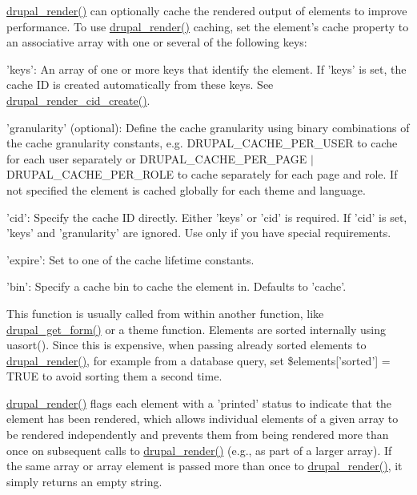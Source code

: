 \hyperlink{common_8inc_a05798b44e8d6c496d4bee5cc32fa7851}{drupal\_\-render()} can optionally cache the rendered output of elements to improve performance. To use \hyperlink{common_8inc_a05798b44e8d6c496d4bee5cc32fa7851}{drupal\_\-render()} caching, set the element's cache property to an associative array with one or several of the following keys:
\begin{DoxyItemize}
\item 'keys': An array of one or more keys that identify the element. If 'keys' is set, the cache ID is created automatically from these keys. See \hyperlink{common_8inc_a28d419376079fb2c1f790d4af72451ec}{drupal\_\-render\_\-cid\_\-create()}.
\item 'granularity' (optional): Define the cache granularity using binary combinations of the cache granularity constants, e.g. DRUPAL\_\-CACHE\_\-PER\_\-USER to cache for each user separately or DRUPAL\_\-CACHE\_\-PER\_\-PAGE $|$ DRUPAL\_\-CACHE\_\-PER\_\-ROLE to cache separately for each page and role. If not specified the element is cached globally for each theme and language.
\item 'cid': Specify the cache ID directly. Either 'keys' or 'cid' is required. If 'cid' is set, 'keys' and 'granularity' are ignored. Use only if you have special requirements.
\item 'expire': Set to one of the cache lifetime constants.
\item 'bin': Specify a cache bin to cache the element in. Defaults to 'cache'.
\end{DoxyItemize}

This function is usually called from within another function, like \hyperlink{group__form__api_ga720df81a837b06dfe19daf1c1eea3437}{drupal\_\-get\_\-form()} or a theme function. Elements are sorted internally using uasort(). Since this is expensive, when passing already sorted elements to \hyperlink{common_8inc_a05798b44e8d6c496d4bee5cc32fa7851}{drupal\_\-render()}, for example from a database query, set \$elements\mbox{[}'sorted'\mbox{]} = TRUE to avoid sorting them a second time.

\hyperlink{common_8inc_a05798b44e8d6c496d4bee5cc32fa7851}{drupal\_\-render()} flags each element with a 'printed' status to indicate that the element has been rendered, which allows individual elements of a given array to be rendered independently and prevents them from being rendered more than once on subsequent calls to \hyperlink{common_8inc_a05798b44e8d6c496d4bee5cc32fa7851}{drupal\_\-render()} (e.g., as part of a larger array). If the same array or array element is passed more than once to \hyperlink{common_8inc_a05798b44e8d6c496d4bee5cc32fa7851}{drupal\_\-render()}, it simply returns an empty string.


